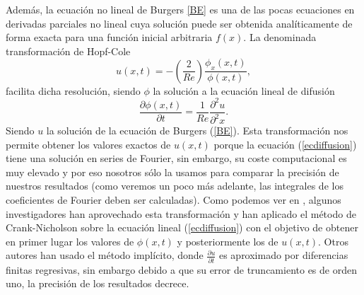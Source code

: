 Además, la ecuación no lineal de Burgers \eqref{BE} es una de las pocas ecuaciones en derivadas parciales no lineal cuya solución puede ser obtenida analíticamente de forma exacta para una función inicial arbitraria $f(x)$. La denominada transformación de Hopf-Cole \cite{H-C}
\begin{equation}\label{transformation}
u(x,t)=-\left( \frac{2}{Re} \right) \frac{\phi_x(x,t)}{\phi(x,t)},
\end{equation}
facilita dicha resolución, siendo $\phi$ la solución a la ecuación lineal de difusión
\begin{equation}\label{ecdiffusion}
\frac{\partial \phi(x,t)}{\partial t}=\frac{1}{Re} \frac{\partial^2
	u}{\partial^2 x}.
\end{equation}
Siendo $u$ la solución de la ecuación de Burgers (\ref{BE}). Esta transformación nos permite obtener los valores exactos de $u(x,t)$ porque la ecuación (\ref{ecdiffusion}) tiene una solución en series de Fourier, sin embargo, su coste computacional es muy elevado y por eso nosotros sólo la usamos para comparar la precisión de nuestros resultados (como veremos un poco más adelante, las integrales de los coeficientes de Fourier deben ser calculadas). Como podemos ver en \cite{KA}, algunos investigadores han aprovechado esta transformación y han aplicado el método de Crank-Nicholson sobre la ecuación lineal (\ref{ecdiffusion}) con el objetivo de obtener en primer lugar los valores de $\phi(x,t)$ y posteriormente los de $u(x,t)$. Otros autores han usado el método implícito, donde $\frac{\partial u}{\partial t}$ es aproximado por diferencias finitas regresivas, sin embargo debido a que su error de truncamiento es de orden uno, la precisión de los resultados decrece.

